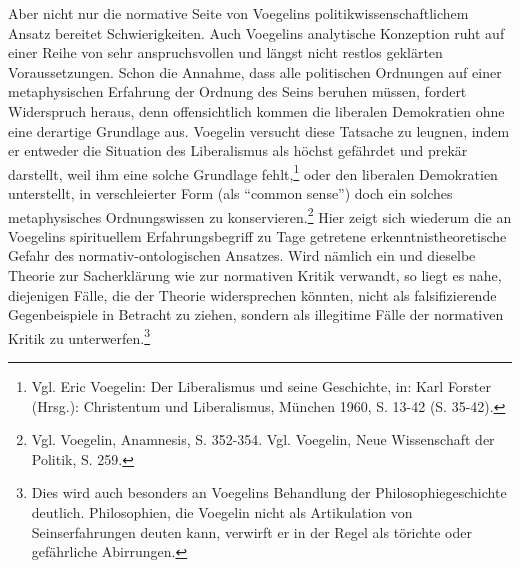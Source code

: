 Aber nicht nur die normative Seite von Voegelins politikwissenschaftlichem
Ansatz bereitet Schwierigkeiten. Auch Voegelins analytische Konzeption ruht
auf einer Reihe von sehr anspruchsvollen und längst nicht restlos geklärten
Voraussetzungen. Schon die Annahme, dass alle politischen Ordnungen auf einer
metaphysischen Erfahrung der Ordnung des Seins beruhen müssen, fordert
Widerspruch heraus, denn offensichtlich kommen die liberalen Demokratien ohne
eine derartige Grundlage aus. Voegelin versucht diese Tatsache zu leugnen,
indem er entweder die Situation des Liberalismus als höchst gefährdet und
prekär darstellt, weil ihm eine solche Grundlage fehlt,\footnote{Vgl. Eric
  Voegelin: Der Liberalismus und seine Geschichte, in: Karl Forster (Hrsg.):
  Christentum und Liberalismus, München 1960, S. 13-42 (S. 35-42).} oder den
liberalen Demokratien unterstellt, in verschleierter Form (als "`common
sense"') doch ein solches metaphysisches Ordnungswissen zu
konservieren.\footnote{Vgl. Voegelin, Anamnesis, S. 352-354. Vgl. Voegelin,
  Neue Wissenschaft der Politik, S. 259.}  Hier zeigt sich wiederum die an
Voegelins spirituellem Erfahrungsbegriff zu Tage getretene
erkenntnistheoretische Gefahr des normativ-ontologischen Ansatzes. Wird
nämlich ein und dieselbe Theorie zur Sacherklärung wie zur normativen Kritik
verwandt, so liegt es nahe, diejenigen Fälle, die der Theorie widersprechen
könnten, nicht als falsifizierende Gegenbeispiele in Betracht zu ziehen,
sondern als illegitime Fälle der normativen Kritik zu
unterwerfen.\footnote{Dies wird auch besonders an Voegelins Behandlung der
  Philosophiegeschichte deutlich.  Philosophien, die Voegelin nicht als
  Artikulation von Seinserfahrungen deuten kann, verwirft er in der Regel als
  törichte oder gefährliche Abirrungen.}

